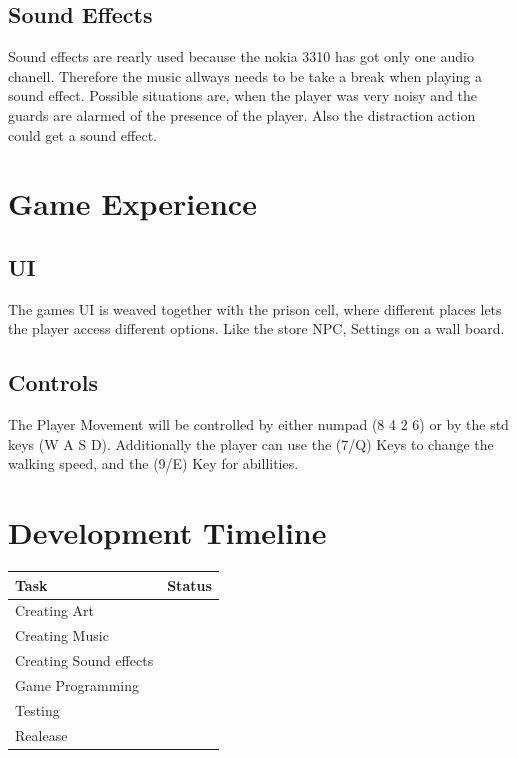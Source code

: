 \documentclass[12pt, a4paper]{article}
\begin{document}
{        \subsection{Sound Effects}
            Sound effects are rearly used because the nokia 3310
            has got only one audio chanell. Therefore the music 
            allways needs to be take a break when playing a sound
            effect. Possible situations are, when the player was very noisy
            and the guards are alarmed of the presence of the player. Also
            the distraction action could get a sound effect.

    \section{Game Experience}
    
        \subsection{UI}
            The games UI is weaved together with the prison cell,
            where different places lets the player access different
            options. Like the store NPC, Settings on a wall board.
            
        \subsection{Controls}
            The Player Movement will be controlled by either numpad (8 4 2 6)
            or by the std keys (W A S D). Additionally the player can use the (7/Q)
            Keys to change the walking speed, and the (9/E) Key for abillities.

    \section{Development Timeline}
        \begin{table}[h]
            \centering
            \begin{tabular}{| m{7cm} | m{7cm} |}\hline
                \textbf{Task} & \textbf{Status}\\\hline\hline
                Creating Art & \\\hline
                Creating Music & \\\hline
                Creating Sound effects & \\\hline
                Game Programming & \\\hline
                Testing & \\\hline
                Realease & \\\hline
            \end{tabular}
        \end{table}
}
\end{document}
